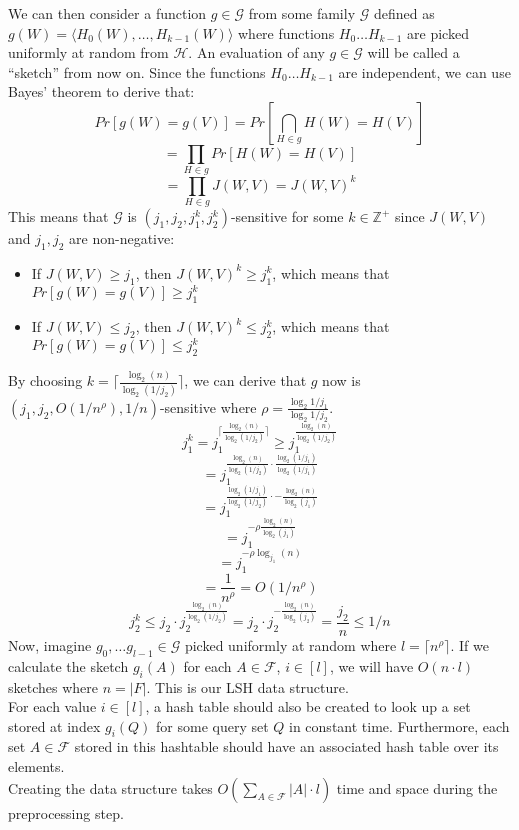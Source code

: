 We can then consider a function $g \in \mathcal{G}$ from some family $\mathcal{G}$ defined as $g(W) = \langle H_0(W), \dots, H_{k-1}(W) \rangle$ where functions $H_0 \dots H_{k-1}$ are picked uniformly at random from $\mathcal{H}$. An evaluation of any $g\in \mathcal{G}$ will be called a ``sketch'' from now on. Since the functions $H_0 \dots H_{k-1}$ are independent, we can use Bayes' theorem to derive that:
$$Pr[g(W)=g(V)] = Pr[\bigcap_{H \in g}H(W) = H(V)]$$
$$=\prod_{H\in g}Pr[H(W) = H(V)]$$
$$=\prod_{H\in g}J(W,V)=J(W,V)^k$$
This means that $\mathcal{G}$ is $(j_1, j_2, j_1^k, j_2^k)$-sensitive for some $k\in \mathbb{Z}^+$ since $J(W,V)$ and $j_1, j_2$ are non-negative:
\begin{itemize}
    \item If $J(W,V) \geq j_1$, then $J(W,V)^k \geq j_1^k$, which means that $Pr[g(W)=g(V)] \geq j_1^k$
    \item If $J(W,V) \leq j_2$, then $J(W,V)^k \leq j_2^k$, which means that $Pr[g(W)=g(V)] \leq j_2^k$
\end{itemize}
By choosing $k=\lceil \frac{\log_2(n)}{\log_2(1/j_2)} \rceil$, we can derive that $g$ now is $(j_1, j_2, O(1/n^\rho), 1/n)$-sensitive where $\rho=\frac{\log_2{1/j_1}}{\log_2{1/j_2}}$.
$$j_1^k = j_1^{\lceil\frac{\log_2(n)}{\log_2(1/j_2)} \rceil}\geq j_1^{\frac{\log_2(n)}{\log_2(1/j_2)}}$$
$$=j_1^{\frac{\log_2{(n)}}{\log_2{(1/j_2)}}\cdot\frac{\log_2{(1/j_1)}}{\log_2{(1/j_1)}}}$$
$$=j_1^{\frac{\log_2{(1/j_1)}}{\log_2{(1/j_2)}}\cdot-\frac{\log_2{(n)}}{\log_2{(j_1)}}}$$
$$=j_1^{-\rho\frac{\log_2{(n)}}{\log_2{(j_1)}}}$$
$$=j_1^{-\rho\log_{j_1}{(n)}}$$
$$=\frac{1}{n^\rho}=O(1/n^\rho)$$
$$j_2^k\leq j_2 \cdot j_2^{\frac{\log_2(n)}{\log_2(1/j_2)}}=j_2\cdot j_2^{-\frac{\log_2{(n)}}{\log_2{(j_2)}}}=\frac{j_2}{n}\leq 1/n$$
Now, imagine $g_0, \dots g_{l-1} \in \mathcal{G}$ picked uniformly at random where $l=\lceil n^\rho \rceil$. If we calculate the sketch $g_i(A)$ for each $A\in \mathcal{F}$, $i\in [l]$, we will have $O(n\cdot l)$ sketches where $n=|F|$. This is our LSH data structure. \\
For each value $i\in [l]$, a hash table should also be created to look up a set stored at index $g_i(Q)$ for some query set $Q$ in constant time.
Furthermore, each set $A\in \mathcal{F}$ stored in this hashtable should have an associated hash table over its elements.\\
Creating the data structure takes $O(\sum_{A\in \mathcal{F}}|A| \cdot l)$ time and space during the preprocessing step.\\
